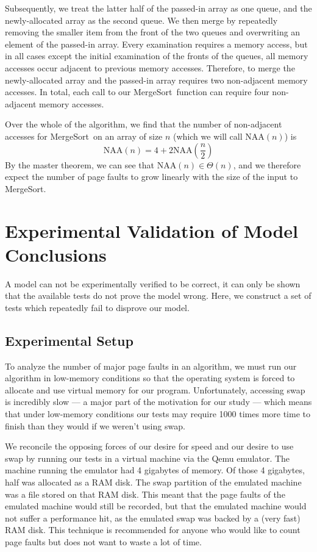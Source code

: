\documentclass{acmtrans2m}
\newcommand{\mergesort}{{\sc MergeSort}}
\newcommand{\NAA}{\textrm{NAA}}
\begin{document}
Subsequently, we treat the latter half of the passed-in array as one queue, and
the newly-allocated array as the second queue.  We then merge by repeatedly
removing the smaller item from the front of the two queues and overwriting an
element of the passed-in array.  Every examination requires a memory access,
but in all cases except the initial examination of the fronts of the queues,
all memory accesses occur adjacent to previous memory accesses.  Therefore, to
merge the newly-allocated array and the passed-in array requires two
non-adjacent memory accesses.  In total, each call to our \mergesort\ function
can require four non-adjacent memory accesses.

Over the whole of the algorithm, we find that the number of non-adjacent
accesses for \mergesort\ on an array of size $n$ (which we will call $\NAA(n)$)
is $$\NAA(n) = 4 + 2\NAA\left(\frac{n}{2}\right)$$ By the master theorem, we
can see that $\NAA(n) \in \Theta(n)$, and we therefore expect the number of
page faults to grow linearly with the size of the input to \mergesort.

\section{Experimental Validation of Model Conclusions} 
\label{experiment}

A model can not be experimentally verified to be correct, it can only be shown
that the available tests do not prove the model wrong.  Here, we construct a
set of tests which repeatedly fail to disprove our model.

\subsection{Experimental Setup}

To analyze the number of major page faults in an algorithm, we must run our
algorithm in low-memory conditions so that the operating system is forced to
allocate and use virtual memory for our program.  Unfortunately, accessing swap
is incredibly slow --- a major part of the motivation for our study --- which
means that under low-memory conditions our tests may require 1000 times more
time to finish than they would if we weren't using swap.  

We reconcile the opposing forces of our desire for speed and our desire to use
swap by running our tests in a virtual machine via the Qemu emulator.  The
machine running the emulator had 4 gigabytes of memory.  Of those 4 gigabytes,
half was allocated as a RAM disk.  The swap partition of the emulated machine
was a file stored on that RAM disk.  This meant that the page faults of the
emulated machine would still be recorded, but that the emulated machine would
not suffer a performance hit, as the emulated swap was backed by a (very fast)
RAM disk.  This technique is recommended for anyone who would like to count
page faults but does not want to waste a lot of time.
\end{document}
